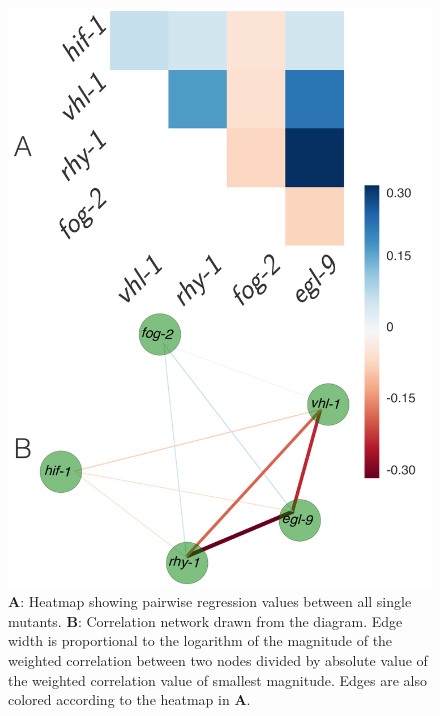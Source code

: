 \documentclass[9pt,twocolumn,twoside]{pnas-new}
\begin{document}
\begin{figure}[tbhp]
\centering
\includegraphics[width=\linewidth]{figs/bayesian_heat_map.pdf}
\caption{
\textbf{A}: Heatmap showing pairwise regression values between all
single mutants. \textbf{B}: Correlation network drawn from the diagram. Edge
width is proportional to the logarithm of the magnitude of the weighted
correlation between two nodes divided by absolute value of the weighted
correlation value of smallest magnitude. Edges are also colored according to the
heatmap in \textbf{A}.
}
\label{fig:heatmap}
\end{figure}
\end{document}
